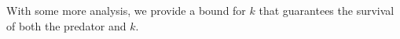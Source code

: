 \documentclass{article}
\newcommand{\textAnd}{
    {
        \hspace{5mm}
        \textrm{and}
        \hspace{5mm}
    }
}
\newtheorem{theorem}{Theorem}[section]
\newtheorem{remark}{Remark}[section]
\newtheorem{theorem}{Theorem}
\newtheorem{remark}{Remark}
\numberwithin{equation}{section}
\begin{document}
With some more analysis, we provide a bound for $k$ that guarantees 
the survival of both the predator and $k$.

\end{document}
